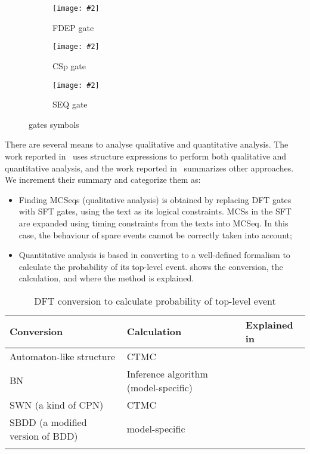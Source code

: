 \documentclass[en,twoside,onehalfspacing,phd]{risethesis}
\newcommand{\includegraphicsaspectratio}[2][1]{%
  \texttt{[image: \#2]}%
}
\begin{document}
\begin{figure}[t]
  \centering
  \begin{subfigure}[b]{.3\linewidth}
    \centering
    \includegraphicsaspectratio[0.7]{ft-symbol-fdep-gate}
    \caption{\Ac{FDEP} gate}\label{fig:dft-fdep-symbol}
  \end{subfigure}%
  \begin{subfigure}[b]{.3\linewidth}
    \centering
    \includegraphicsaspectratio[1]{ft-symbol-csp-gate}
    \caption{\Ac{CSp} gate}\label{fig:dft-csp-symbol}
  \end{subfigure}%
  \begin{subfigure}[b]{.3\linewidth}
    \centering
    \includegraphicsaspectratio[0.8]{ft-symbol-seq-gate}
    \caption{\Ac{SEQ} gate}\label{fig:dft-seq-symbol}
  \end{subfigure}%
  \caption{ gates symbols}
  \label{fig:dft-symbols}
\end{figure}


There are several means to analyse qualitative and quantitative analysis.
The work reported in~\cite{Merle2010,MRL+2010,MRL2011,MRL2014} uses structure expressions to perform both qualitative and quantitative analysis, and the work reported in~\cite{MRL2014} summarizes other approaches.
We increment their summary and categorize them as:
%
\begin{itemize}
  \item
  Finding \acp{MCSeq} (qualitative analysis) is obtained by replacing \ac{DFT} gates with \ac{SFT} gates, using the text as its logical constraints.
  \Acp{MCS} in the \ac{SFT} are expanded using timing constraints from the texts into \ac{MCSeq}.
  In this case, the behaviour of spare events cannot be correctly taken into account;
  \item
  Quantitative analysis is based in converting  to a well-defined formalism to calculate the probability of its top-level event.
   shows the conversion, the calculation, and where the method is explained.
\end{itemize}

\begin{table}[t]
  \caption{\Ac{DFT} conversion to calculate probability of top-level event}
  \label{tbl:dft-conversion-te-probability}
  \centering
  \begin{tabularx}{\linewidth}{XXX}
  \hline\noalign{\smallskip}
  \textbf{Conversion} & \textbf{Calculation} & \textbf{Explained in}\\
  \hline\noalign{\smallskip}\hline\noalign{\smallskip}
  Automaton-like structure & \ac{CTMC} & \cite{CSD2000}\\
  \hline\noalign{\smallskip}
  \Ac{BN} & Inference algorithm (model-specific) & \cite{BRM+2005}\\
  \hline\noalign{\smallskip}
  \Ac{SWN} (a kind of \ac{CPN}) & \ac{CTMC} & \cite{BR2004} \\
  \hline\noalign{\smallskip}
  \Ac{SBDD} (a modified version of \ac{BDD}) & model-specific & \cite{TXD2011,XTD2012} \\
  \hline\noalign{\smallskip}
  \end{tabularx}
\end{table}
\end{document}
